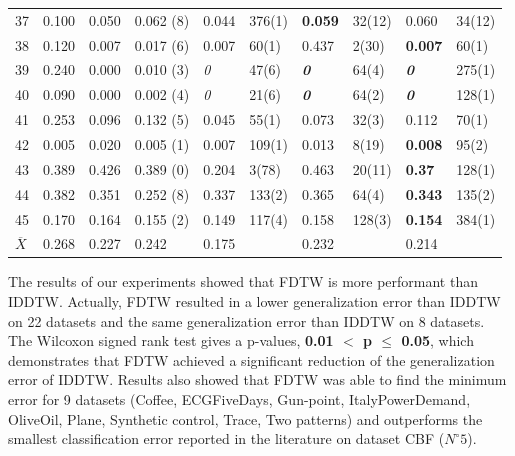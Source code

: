 \begin{center}
\begin{supertabular}{|p{0.15cm}|p{1cm}ll|ll|ll|ll|}
37 & 0.100 & 0.050 & 0.062 (8)  & 0.044 & 376(1) & \textbf{0.059} &
32(12) & 0.060 & 34(12)\tabularnewline 


38 & 0.120 & 0.007 & 0.017 (6)  & 0.007 & 60(1) & 0.437 & 2(30) & \textbf{0.007}
& 60(1)\tabularnewline 


39 & 0.240 & 0.000 & 0.010 (3)  & \emph{0} & 47(6) & \textbf{\emph{0}} &
64(4) & \textbf{\emph{0}} & 275(1)\tabularnewline 


40 & 0.090 & 0.000 & 0.002 (4)  & \emph{0} & 21(6) & \textbf{\emph{0}} &
64(2) & \textbf{\emph{0}} & 128(1)\tabularnewline 


41 & 0.253 & 0.096 & 0.132 (5)  & 0.045 & 55(1) & 0.073 & 32(3) & 0.112 &
70(1)\tabularnewline 


42 & 0.005 & 0.020 & 0.005 (1)  & 0.007 & 109(1) & 0.013 & 8(19) & \textbf{0.008} &
95(2)\tabularnewline 


43 & 0.389 & 0.426 & 0.389 (0)  & 0.204 & 3(78) &  0.463  & 20(11) &
\textbf{0.37} & 128(1)\tabularnewline 


44 & 0.382 & 0.351 & 0.252 (8)  & 0.337 & 133(2) & 0.365 & 64(4) & \textbf{0.343} &
135(2)\tabularnewline 


45 & 0.170 & 0.164 & 0.155 (2)  & 0.149 & 117(4) & 0.158 & 128(3) &
\textbf{0.154} & 384(1)\tabularnewline


\hline 
$\overline{X}$  & 0.268 & 0.227 & 0.242 &  0.175 &  & 0.232 &  & 0.214 & \tabularnewline


\hline 
\end{supertabular}
\end{center}



The results of our experiments showed that FDTW is more performant than IDDTW. Actually, FDTW resulted in a
lower generalization error than IDDTW on 22 datasets and the same generalization error than IDDTW on 8
datasets.  The Wilcoxon signed rank test gives a
p-values, \textbf{ 0.01 $<$ p $\leq$ 0.05}, which demonstrates that FDTW achieved a
significant reduction of the generalization error of IDDTW. Results also showed that FDTW was able to
find the minimum error for 9 datasets (Coffee, ECGFiveDays, Gun-point, ItalyPowerDemand, OliveOil, Plane, Synthetic control, Trace, Two
patterns) and outperforms the smallest classification error reported in the literature on
dataset CBF ($N^{\circ} 5$).




